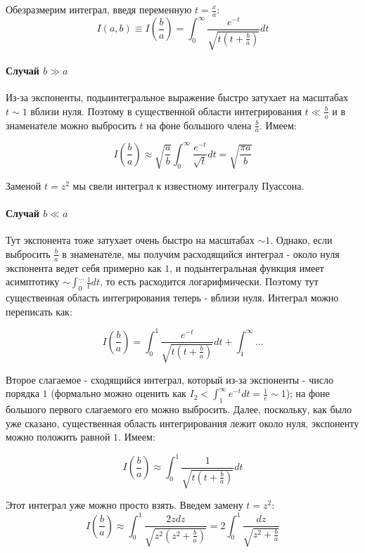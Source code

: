 \documentclass[a4paper,12pt]{article}
\begin{document}
Обезразмерим интеграл, введя переменную $t=\frac{x}{a}$:
\[
I(a,b)\equiv I\left(\frac{b}{a}\right)=\int_{0}^{\infty}\frac{e^{-t}}{\sqrt{t\left(t+\frac{b}{a}\right)}}dt
\]



\paragraph{Случай $b\gg a$}

Из-за экспоненты, подыинтегральное выражение быстро затухает на масштабах
$t\sim1$ вблизи нуля. Поэтому в существенной области интегрирования
$t\ll\frac{b}{a}$ и в знаменателе можно выбросить $t$ на фоне большого
члена $\frac{b}{a}$. Имеем:

\[
I\left(\frac{b}{a}\right)\approx\sqrt{\frac{a}{b}}\int_{0}^{\infty}\frac{e^{-t}}{\sqrt{t}}dt = \sqrt{\frac{\pi a}{b}}
\]

\noindent
Заменой $t=z^{2}$ мы свели интеграл к известному интегралу Пуассона.



\paragraph{Случай $b\ll a$}

Тут экспонента тоже затухает очень быстро на масштабах $\sim1$. Однако,
если выбросить $\frac{b}{a}$ в знаменателе, мы получим расходящийся
интеграл - около нуля экспонента ведет себя примерно как $1$, и подынтегральная
функция имеет асимптотику $\sim\int_{0}^{\dots}\frac{1}{t}dt$,
то есть расходится логарифмически. Поэтому тут существенная область
интегрирования теперь - вблизи нуля. Интеграл можно переписать как:

\[
I\left(\frac{b}{a}\right)=\int_{0}^{1}\frac{e^{-t}}{\sqrt{t\left(t+\frac{b}{a}\right)}}dt+\int_{1}^{\infty}\dots
\]

\noindent
Второе слагаемое - сходящийся интеграл, который из-за экспоненты -
число порядка $1$ (формально можно оценить как $I_{2}<\int_{1}^{\infty}e^{-t}dt=\frac{1}{e}\sim1$);
на фоне большого первого слагаемого его можно выбросить. Далее, поскольку,
как было уже сказано, существенная область интегрирования лежит около
нуля, экспоненту можно положить равной $1$. Имеем:

\[
I\left(\frac{b}{a}\right)\approx\int_{0}^{1}\frac{1}{\sqrt{t\left(t+\frac{b}{a}\right)}}dt
\]

\noindent
Этот интеграл уже можно просто взять. Введем замену $t=z^{2}$:
\[
I\left(\frac{b}{a}\right)\approx\int_{0}^{1}\frac{2zdz}{\sqrt{z^{2}\left(z^{2}+\frac{b}{a}\right)}}=2\int_{0}^{1}\frac{dz}{\sqrt{z^{2}+\frac{b}{a}}}
\]
\end{document}
